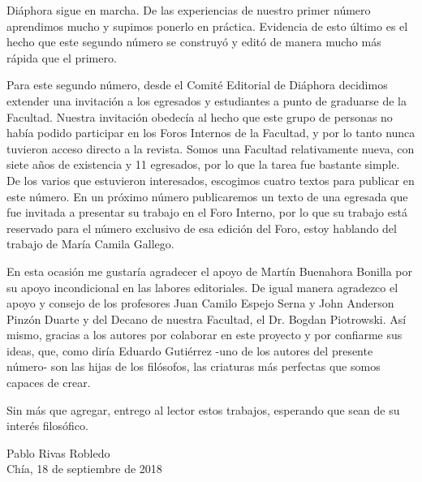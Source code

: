 \begin{refsection}

Diáphora sigue en marcha. De las experiencias de nuestro primer número
aprendimos mucho y supimos ponerlo en práctica. Evidencia de esto último es
el hecho que este segundo número se construyó y editó de manera mucho más
rápida que el primero.

Para este segundo número, desde el Comité Editorial de Diáphora decidimos
extender una invitación a los egresados y estudiantes a punto de graduarse de
la Facultad. Nuestra invitación obedecía al hecho que este grupo de personas no
había podido participar en los Foros Internos de la Facultad, y por lo tanto nunca
tuvieron acceso directo a la revista. Somos una Facultad relativamente nueva,
con siete años de existencia y 11 egresados, por lo que la tarea fue bastante
simple. De los varios que estuvieron interesados, escogimos cuatro textos para
publicar en este número. En un próximo número publicaremos un texto de una
egresada que fue invitada a presentar su trabajo en el Foro Interno, por lo que
su trabajo está reservado para el número exclusivo de esa edición del Foro, estoy
hablando del trabajo de María Camila Gallego.

En esta ocasión me gustaría agradecer el apoyo de Martín Buenahora Bonilla por
su apoyo incondicional en las labores editoriales. De igual manera agradezco el
apoyo y consejo de los profesores Juan Camilo Espejo Serna y John Anderson
Pinzón Duarte y del Decano de nuestra Facultad, el Dr. Bogdan Piotrowski. Así
mismo, gracias a los autores por colaborar en este proyecto y por confiarme sus
ideas, que, como diría Eduardo Gutiérrez -uno de los autores del presente
número- son las hijas de los filósofos, las criaturas más perfectas que somos
capaces de crear.

Sin más que agregar, entrego al lector estos trabajos, esperando que sean de su
interés filosófico.

\begin{flushright}
	Pablo Rivas Robledo\\
	Chía, 18 de septiembre de 2018
\end{flushright}

\makeatletter\@openrightfalse
{}
\@openrighttrue\makeatother
\end{refsection}
\fancyfoot[RE,RO]{}